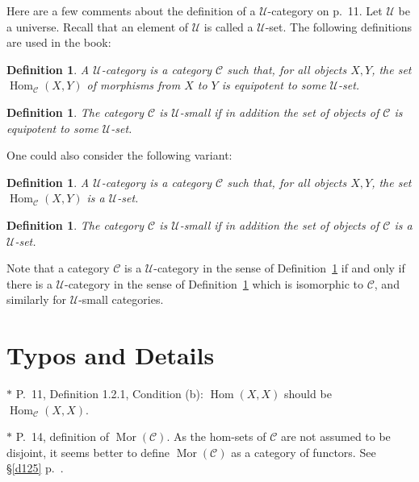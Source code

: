 \documentclass[12pt]{article}%
\newtheorem{df}[thm]{Definition}%
\theoremstyle{remark}
\theoremstyle{definition}
\newcommand{\C}{\mathcal C}
\newcommand{\U}{\mathcal U}
\DeclareMathOperator{\Hom}{Hom}%
\DeclareMathOperator{\Mor}{Mor}
\begin{document}
Here are a few comments about the definition of a $\U$-category on p.~11. Let $\U$ be a universe. Recall that an element of $\U$ is called a $\U$-set. The following definitions are used in the book: 

\begin{df}\label{ucatg}
A $\U$-{\em category} is a category $\C$ such that, for all objects $X,Y$, the set $\Hom_\C(X,Y)$ of morphisms from $X$ to $Y$ is equipotent to some $\U$-set. 
\end{df} 

\begin{df}
The category $\C$ is $\U$-{\em small} if in addition the set of objects of $\C$ is equipotent to some $\U$-set. 
\end{df} 

One could also consider the following variant: 

\begin{df}\label{ducat}
A $\U$-{\em category} \index{$\U$-category} is a category $\C$ such that, for all objects $X,Y$, the set $\Hom_\C(X,Y)$ is a $\U$-set. 
\end{df} 

\begin{df}\label{small}
The category $\C$ is $\U$-{\em small} \index{$\U$-small category}  if in addition the set of objects of $\C$ is a $\U$-set. 
\end{df} 

Note that a category $\C$ is a $\U$-category in the sense of Definition~\ref{ucatg} if and only if there is a $\U$-category in the sense of Definition~\ref{ducat} which is isomorphic to $\C$, and similarly for $\U$-small categories.%
%
\begin{center}
\end{center}


\section{Typos and Details}

$*$ P.~11, Definition 1.2.1, Condition (b): $\Hom(X,X)$ should be $\Hom_{\C}(X,X)$. 

\noindent $*$ P.~14, definition of $\Mor(\C)$. As the hom-sets of $\C$ are not assumed to be disjoint, it seems better to define $\Mor(\C)$ as a category of functors. See \S\ref{d125} p.~\pageref{d125}.
\end{document}
